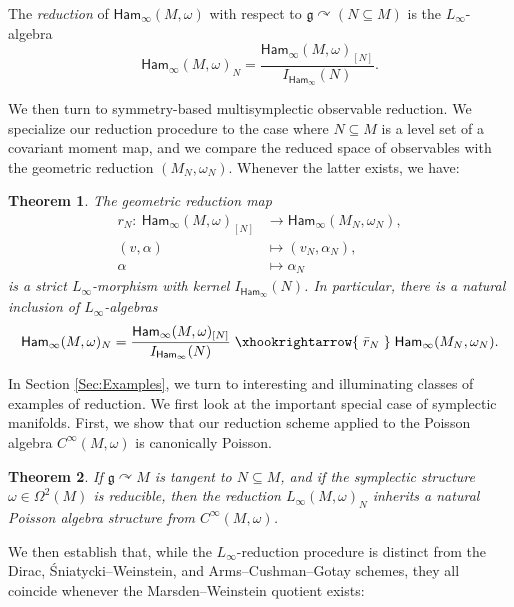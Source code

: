 \documentclass[pdftex]{sigma}
\numberwithin{equation}{section}
\newtheorem{Theorem}{Theorem}[section]
\newcommand{\g}{\mathfrak{g}}
\newcommand{\Ham}{\mathsf{Ham}}
\renewcommand{\subset}{\subseteq}
\begin{document}
\setcounter{section}{2}
\setcounter{Theorem}{20}
\begin{Definition}
	The \emph{reduction} of $\Ham_\infty(M,\omega)$ with respect to $\g\curvearrowright (N\subset M)$ is the $L_\infty$-algebra
	\[
	\Ham_\infty(M,\omega)_N = \frac{\Ham_\infty(M,\omega)_{[N]}}{I_{\Ham_\infty}(N)}.
	\]
\end{Definition}

We then turn to symmetry-based multisymplectic observable reduction. We specialize our reduction procedure to the case where $N\subset M$ is a level set of a covariant moment map, and we compare the reduced space of observables with the geometric reduction $(M_N,\omega_N)$. Whenever the latter exists, we have:

\setcounter{section}{2}
\setcounter{Theorem}{37}
\begin{Theorem}
	The geometric reduction map
	\begin{align*}
		r_N\colon \	\Ham_\infty(M,\omega)_{[N]}	&\to		\Ham_\infty(M_N,\omega_N),		\\
		(v,\alpha)			&\mapsto	(v_N,\alpha_N)	,		\\
		\alpha		&\mapsto	\alpha_N
	\end{align*}
	is a strict $L_\infty$-morphism with kernel $I_{\Ham_\infty}(N)$. In particular, there is a natural inclusion of $L_\infty$-algebras
	\[
	\Ham_\infty(M,\omega)_N = \frac{\Ham_\infty(M,\omega)_{[N]}}{I_{\Ham_\infty}(N)} \;\xhookrightarrow{\;\bar{r}_N\;}\; \Ham_\infty(M_N,\omega_N).
	\]
\end{Theorem}

In Section \ref{Sec:Examples}, we turn to interesting and illuminating classes of examples of reduction. We first look at the important special case of symplectic manifolds. First, we show that our reduction scheme applied to the Poisson algebra $C^\infty(M,\omega)$ is canonically Poisson.

\setcounter{section}{3}
\setcounter{Theorem}{0}
\begin{Theorem}
	If $\g\curvearrowright M$ is tangent to $N\subset M$, and if the symplectic structure $\omega\in\Omega^2(M)$ is reducible, then the reduction $L_\infty(M,\omega)_N$ inherits a natural Poisson algebra structure from $C^\infty(M,\omega)$.
\end{Theorem}

We then establish that, while the $L_\infty$-reduction procedure is distinct from the Dirac, \'Snia\-tycki--Weinstein, and Arms--Cushman--Gotay schemes, they all coincide whenever the Marsden--Wein\-stein quotient exists:
\end{document}

